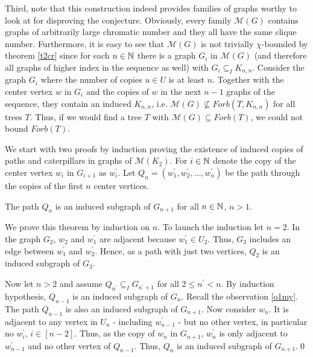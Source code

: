 Third, note that this construction indeed provides families of graphs worthy to look at for disproving the conjecture. Obviously, every family $\mathcal{M}(G)$ contains graphs of arbitrarily large chromatic number and they all have the same clique number. Furthermore, it is easy to see that $\mathcal{M}(G)$ is not trivially $\chi$-bounded by theorem \ref{t2cr} since for each $n\in\mathbb{N}$ there is a graph $G_i$ in $\mathcal{M}(G)$ (and therefore all graphs of higher index in the sequence as well) with $G_i\subseteq_I K_{n,n}$. Consider the graph $G_i$ where the number of copies $u\in U$ is at least $n$. Together with the center vertex $w$ in $G_i$ and the copies of $w$ in the next $n-1$ graphs of the sequence, they contain an induced $K_{n,n}$, i.e. $\mathcal{M}(G)\nsubseteq\textit{Forb}(T,K_{n,n})$ for all trees $T$. Thus, if we would find a tree $T$ with $\mathcal{M}(G)\subseteq \textit{Forb}(T)$, we could not bound $\textit{Forb}(T)$.

We start with two proofs by induction proving the existence of induced copies of paths and caterpillars in graphs of $\mathcal{M}(K_2)$. For $i\in\mathbb{N}$ denote the copy of the center vertex $w_i$ in $G_{i+1}$ as $w_i^\prime$. Let $Q_n =(w_1^\prime ,w_2^\prime ,\dots ,w_n^\prime)$ be the path through the copies of the first $n$ center vertices. 
\begin{thm}\label{t1my}
The path $Q_n$ is an induced subgraph of $G_{n+1}$ for all $n\in\mathbb{N}$, $n>1$.
\end{thm}
\begin{prf}
We prove this theorem by induction on $n$. To launch the induction let $n=2$. In the graph $G_2$, $w_2$ and $w^\prime_1$ are adjacent because $w^\prime_1\in U_2$. Thus, $G_3$ includes an edge between $w^\prime_1$ and $w^\prime_2$. Hence, as a path with just two vertices, $Q_2$ is an induced subgraph of $G_3$.

Now let $n>2$ and assume $Q_{n^\prime}\subseteq_I G_{n^\prime +1}$ for all $2\leq n^\prime <n$. By induction hypothesis, $Q_{n-1}$ is an induced subgraph of $G_n$. Recall the observation \ref{o1my}. The path $Q_{n-1}$ is also an induced subgraph of $G_{n+1}$. 
Now consider $w_n$. It is adjacent to any vertex in $U_n$ - including $w^\prime_{n-1}$ - but no other vertex, in particular no $w^\prime_i$, $i\in [n-2]$. Thus, as the copy of $w_n$ in $G_{n+1}$, $w^\prime_n$ is only adjacent to $w^\prime_{n-1}$ and no other vertex of $Q_{n-1}$. Thus, $Q_n$ is an induced subgraph of $G_{n+1}$.\qed
\end{prf}

